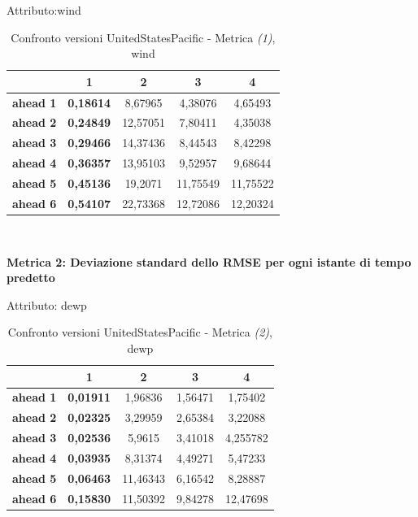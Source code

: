 \documentclass[12pt,a4paper,oneside,openright]{book}
\begin{document}
\medskip

Attributo:wind \\ 

\begin{table}[H]
\centering
\begin{tabular}{|c|c|c|c|c|}
\hline
& 1 & 2 & 3 & 4 \\
\hline
\textbf{ahead 1} & \textbf{0,18614} & 8,67965 & 4,38076 & 4,65493\\
\hline
\textbf{ahead 2} & \textbf{0,24849} & 12,57051 & 7,80411 & 4,35038\\
\hline
\textbf{ahead 3} & \textbf{0,29466} & 14,37436 & 8,44543 & 8,42298\\
\hline
\textbf{ahead 4} & \textbf{0,36357} & 13,95103 & 9,52957 & 9,68644\\
\hline
\textbf{ahead 5} & \textbf{0,45136} & 19,2071 & 11,75549 & 11,75522\\
\hline
\textbf{ahead 6} & \textbf{0,54107} & 22,73368 & 12,72086 & 12,20324\\
\hline
\end{tabular} \\
\caption{Confronto versioni UnitedStatesPacific - Metrica \textit{(1)}, wind}
\end{table} 


\newpage

\textbf{Metrica 2: Deviazione standard dello RMSE per ogni istante di tempo predetto} 

\medskip

Attributo: dewp \\ 

\begin{table}[H]
\centering
\begin{tabular}{|c|c|c|c|c|}
\hline
& 1 & 2 & 3 & 4 \\
\hline
\textbf{ahead 1} & \textbf{0,01911} & 1,96836 & 1,56471 & 1,75402\\
\hline
\textbf{ahead 2} & \textbf{0,02325} & 3,29959 & 2,65384 & 3,22088\\
\hline
\textbf{ahead 3} & \textbf{0,02536} & 5,9615 & 3,41018 & 4,255782\\
\hline
\textbf{ahead 4} & \textbf{0,03935} & 8,31374 & 4,49271 & 5,47233\\
\hline
\textbf{ahead 5} & \textbf{0,06463} & 11,46343 & 6,16542 & 8,28887\\
\hline
\textbf{ahead 6} & \textbf{0,15830} & 11,50392 & 9,84278 & 12,47698\\
\hline
\end{tabular} \\
\caption{Confronto versioni UnitedStatesPacific - Metrica \textit{(2)}, dewp}
\end{table} 
\end{document}
